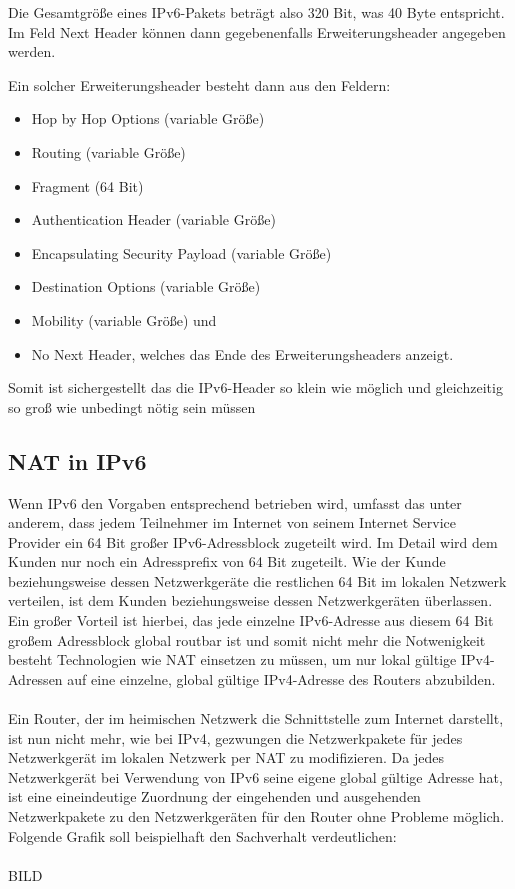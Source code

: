 \documentclass[a4paper,12pt]{scrartcl}
\begin{document}
Die Gesamtgr\"o{\ss}e eines IPv6-Pakets betr\"agt also 320 Bit, was 40 Byte entspricht. Im Feld Next Header können dann gegebenenfalls Erweiterungsheader angegeben werden.  

Ein solcher Erweiterungsheader besteht dann aus den Feldern:
\begin{itemize}
 	\item Hop by Hop Options (variable Gr\"o{\ss}e)
	\item  Routing  (variable Gr\"o{\ss}e)
	\item Fragment (64 Bit)
	\item Authentication Header (variable Gr\"o{\ss}e)
	\item Encapsulating Security Payload  (variable Gr\"o{\ss}e)
	\item Destination Options  (variable Gr\"o{\ss}e)
	\item Mobility  (variable Gr\"o{\ss}e) und 
	\item No Next Header, welches das Ende des Erweiterungsheaders anzeigt. 
\end{itemize}

Somit ist sichergestellt das die IPv6-Header so klein wie möglich und gleichzeitig so gro{\ss} wie unbedingt nötig sein müssen  

\subsection{NAT in IPv6}
Wenn IPv6 den Vorgaben entsprechend betrieben wird, umfasst das unter anderem, dass jedem Teilnehmer im Internet von seinem Internet Service Provider ein 64 Bit gro{\ss}er  IPv6-Adressblock zugeteilt wird. Im Detail wird dem Kunden nur noch ein Adressprefix von 64 Bit zugeteilt. Wie der Kunde beziehungsweise dessen Netzwerkger\"ate die restlichen 64 Bit im lokalen Netzwerk verteilen, ist dem Kunden beziehungsweise dessen Netzwerkger\"aten  \"uberlassen. Ein gro{\ss}er Vorteil ist hierbei, das jede einzelne IPv6-Adresse aus diesem 64 Bit gro{\ss}em Adressblock global routbar ist und somit nicht mehr die Notwenigkeit besteht Technologien wie NAT einsetzen zu m\"ussen, um nur lokal g\"ultige IPv4-Adressen auf eine einzelne, global g\"ultige IPv4-Adresse des Routers abzubilden.\\
\\

Ein Router, der im heimischen Netzwerk die Schnittstelle zum Internet darstellt, ist nun nicht mehr, wie bei IPv4, gezwungen die Netzwerkpakete f\"ur jedes Netzwerkger\"at im lokalen Netzwerk per NAT zu modifizieren. Da jedes Netzwerkger\"at bei Verwendung von IPv6 seine eigene global g\"ultige Adresse hat, ist eine eineindeutige Zuordnung der eingehenden und ausgehenden Netzwerkpakete zu den Netzwerkger\"aten f\"ur den Router ohne Probleme m\"oglich.  Folgende Grafik soll beispielhaft den Sachverhalt verdeutlichen:\\
\\
BILD
\end{document}
